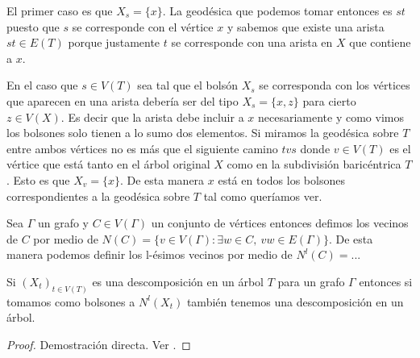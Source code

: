 \documentclass[tesis.tex]{subfiles}
\begin{document}
\begin{obs}
\begin{enumerate}
	El primer caso es que $X_s = \{ x \}$.
	La geodésica que podemos tomar entonces es $st$ puesto que $s$ se corresponde con el vértice $x$ y sabemos que existe una arista $st \in E(T)$ porque justamente $t$ se corresponde con una arista en $X$ que contiene a $x$.
	
	En el caso que $s \in V(T)$ sea tal que el bolsón $X_s$ se corresponda con los vértices que aparecen en una arista debería ser del tipo $X_s = \{x,z\}$ para cierto $z \in V(X)$. 
	Es decir que la arista debe incluir a $x$ necesariamente y como vimos los bolsones solo tienen a lo sumo dos elementos.
	Si miramos la geodésica sobre $T$ entre ambos vértices no es más que el siguiente camino $tvs$ donde $v \in V(T)$ es el vértice que está tanto en el árbol original $X$ como en la subdivisión baricéntrica $T$.
	Esto es que $X_v = \{ x \}$.
	De esta manera $x$ está en todos los bolsones correspondientes a la geodésica sobre $T$ tal como queríamos ver.	
\end{enumerate}
\end{obs}



\begin{deff}
	Sea $\Gamma$ un grafo y $C \in V(\Gamma)$ un conjunto de vértices entonces defimos los vecinos de $C$ por medio de $N(C) = \{ v \in V(\Gamma) : \exists w \in C, \ vw \in E(\Gamma) \}$.
	De esta manera podemos definir los l-ésimos vecinos por medio de $N^l(C) = ... $
\end{deff}


\begin{prop}
	Si $(X_t)_{t \in V(T)}$ es una descomposición en un árbol $T$ para un grafo $\Gamma$ entonces si tomamos como bolsones a $N^l(X_t)$ también tenemos una descomposición en un árbol.
\end{prop}
\begin{proof}
	Demostración directa. Ver \cite{diekert_context-free_2022}.
\end{proof}
\medskip
\end{document}
